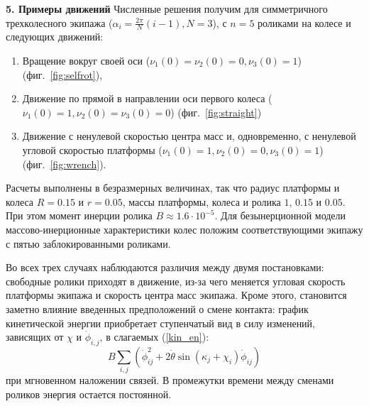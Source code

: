 
{\bf 5. Примеры движений}
Численные решения получим для симметричного трехколесного экипажа ($\alpha_i = \frac{2\pi}{N}(i - 1), N = 3$), с $n = 5$ роликами на колесе и следующих движений:
\begin{enumerate}[wide]
  \item \label{sol:selfrot} Вращение вокруг своей оси ($\nu_1(0) = \nu_2(0) = 0, \nu_3(0) = 1$) (фиг.~\ref{fig:selfrot}),
  \item \label{sol:straight} Движение по прямой в направлении оси первого колеса ($\nu_1(0) = 1, \nu_2(0) = \nu_3(0) = 0$) (фиг.~\ref{fig:straight})
  \item \label{sol:wrench} Движение с ненулевой скоростью центра масс и, одновременно, с ненулевой угловой скоростью платформы ($\nu_1(0) = 1, \nu_2(0) = 0, \nu_3(0) = 1$) (фиг.~\ref{fig:wrench}).
\end{enumerate}


Расчеты выполнены в безразмерных величинах, так что радиус платформы и колеса $R = 0.15$ и $r = 0.05$, массы платформы, колеса и ролика $1$, $0.15$ и $0.05$. При этом момент инерции ролика $B \approx 1.6 \cdot 10^{-5}$. Для безынерционной модели массово-инерционные характеристики колес положим соответствующими экипажу с пятью заблокированными роликами.

Во всех трех случаях наблюдаются различия между двумя постановками: свободные ролики приходят в движение, из-за чего меняется угловая скорость платформы экипажа и скорость центра масс экипажа. Кроме этого, становится заметно влияние введенных предположений о смене контакта: график кинетической энергии приобретает ступенчатый вид в силу изменений, зависящих от $\chi$ и $\dot{\phi}_{i,j}$, в слагаемых (\ref{kin_en}): 
\begin{equation}\label{sines_in_kin_en}
    B\sum_{i,j}(\dot{\phi}_{ij}^2 + 2\dot{\theta}\sin(\kappa_j + \chi_i)\dot{\phi}_{ij})
\end{equation}
при мгновенном наложении связей. В промежутки времени между сменами роликов энергия остается постоянной. 

